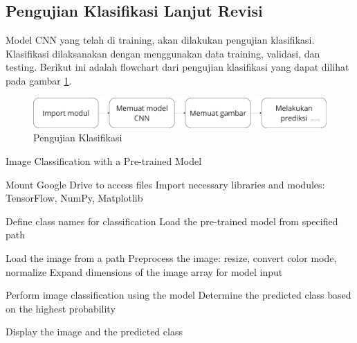 \subsection{Pengujian Klasifikasi Lanjut Revisi}
Model CNN yang telah di training, akan dilakukan pengujian klasifikasi. Klasifikasi dilaksanakan dengan menggunakan data training, validasi, dan testing. Berikut ini adalah flowchart dari pengujian klasifikasi yang dapat dilihat pada gambar \ref{fig:ujiklasifikasi}.

\begin{minipage}{\linewidth}
  \begin{figure} [H] \centering
    \includegraphics[scale=0.1]{gambar/bab3/ujiklasifikasi.png}
    \caption{Pengujian Klasifikasi}
    \label{fig:ujiklasifikasi}
  \end{figure}
\end{minipage}

\begin{algorithm}
  \caption{Image Classification with a Pre-trained Model}
  \begin{algorithmic}[1]
  \State Mount Google Drive to access files
  \State Import necessary libraries and modules: TensorFlow, NumPy, Matplotlib
  
  \State Define class names for classification
  \State Load the pre-trained model from specified path
  
  \State Load the image from a path
  \State Preprocess the image: resize, convert color mode, normalize
  \State Expand dimensions of the image array for model input
  
  \State Perform image classification using the model
  \State Determine the predicted class based on the highest probability
  
  \State Display the image and the predicted class
  \end{algorithmic}
\end{algorithm}

